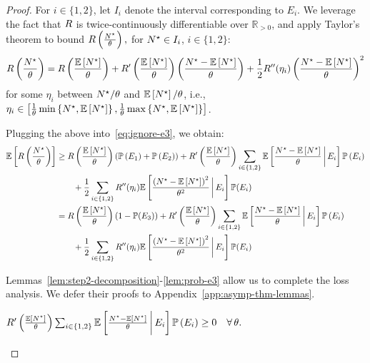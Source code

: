 \documentclass[12pt]{article}
\begin{document}
\begin{proof}
For $i \in \{1,2\}$, let $I_i$ denote the interval corresponding to $E_i$. We leverage the fact that {$R$ is twice-continuously differentiable over $\mathbb{R}_{> 0}$}, and apply Taylor's theorem to bound $R\left(\frac{{N}^\star}{\theta}\right),$ for {${N}^\star \in I_i$, $i \in \{1,2\}$}:
\begin{align}\label{eq:taylor}
R\left(\frac{{N}^\star}{\theta}\right) = R\left(\frac{\mathbb{E}\left[{N}^\star\right]}{\theta}\right) + R'\left(\frac{\mathbb{E}\left[{N}^\star\right]}{\theta}\right)\left(\frac{{N}^\star-\mathbb{E}\left[{N}^\star\right]}{\theta}\right) + \frac12 R''(\eta_i)\left(\frac{{N}^\star-\mathbb{E}\left[{N}^\star\right]}{\theta}\right)^2
\end{align}
for some {$\eta_i$ between ${N}^\star/\theta$ and $\mathbb{E}\left[{N}^\star\right]/\theta$, i.e.,} $\eta_i \in \left[\frac1\theta\min\left\{{N}^\star,{\mathbb{E}\left[{N}^\star\right]}\right\},\frac1\theta\max\left\{{{N}^\star},{\mathbb{E}\left[{N}^\star\right]}\right\}\right]$.

Plugging the above into~\eqref{eq:ignore-e3}, we obtain:
\begin{align}\label{eq:expected-taylor}
    \mathbb{E}\left[R\left(\frac{{N}^\star}{\theta}\right)\right] &\geq R\left(\frac{\mathbb{E}\left[{N}^\star\right]}{\theta}\right) \left(\mathbb{P}\left(E_1\right)+\mathbb{P}\left(E_2\right)\right) + R'\left(\frac{\mathbb{E}\left[{N}^\star\right]}{\theta}\right)\sum_{i\in\{1,2\}}\mathbb{E}\left[\frac{{{N}^\star-\mathbb{E}\left[{N}^\star\right]}}{\theta}\,\bigg{|}\,E_i\right]\mathbb{P}\left(E_i\right) \notag \\
    &\qquad + \frac{1}{2}\sum_{i\in\{1,2\}}R''(\eta_i) \mathbb{E}\left[\frac{\left({N}^\star-\mathbb{E}\left[{N}^\star\right]\right)^2}{\theta^2}\,\bigg{|}\,E_i\right]\mathbb{P}(E_i) \notag \\
    &= R\left(\frac{\mathbb{E}\left[{N}^\star\right]}{\theta}\right) \left(1-\mathbb{P}(E_3)\right) + R'\left(\frac{\mathbb{E}\left[{N}^\star\right]}{\theta}\right)\sum_{i\in\{1,2\}}\mathbb{E}\left[\frac{{{N}^\star-\mathbb{E}\left[{N}^\star\right]}}{\theta}\,\bigg{|}\,E_i\right]\mathbb{P}\left(E_i\right) \notag \\
    &\qquad + \frac{1}{2}\sum_{i\in\{1,2\}}R''(\eta_i) \mathbb{E}\left[\frac{\left({N}^\star-\mathbb{E}\left[{N}^\star\right]\right)^2}{\theta^2}\,\bigg{|}\,E_i\right]\mathbb{P}(E_i)
\end{align}

Lemmas~\ref{lem:step2-decomposition}-\ref{lem:prob-e3} allow us to complete the {loss} analysis. We defer their proofs to Appendix~\ref{app:asymp-thm-lemmas}.

\begin{lemma}\label{lem:step2-decomposition}
$R'\left(\frac{\mathbb{E}\left[{N}^\star\right]}{\theta}\right)\sum_{i\in\{1,2\}}\mathbb{E}\left[\frac{{{N}^\star-\mathbb{E}\left[{N}^\star\right]}}{\theta}\,\bigg{|}\,E_i\right]\mathbb{P}\left(E_i\right) \geq 0 \quad \forall \, \theta.$
\end{lemma}





\end{proof}
\end{document}
